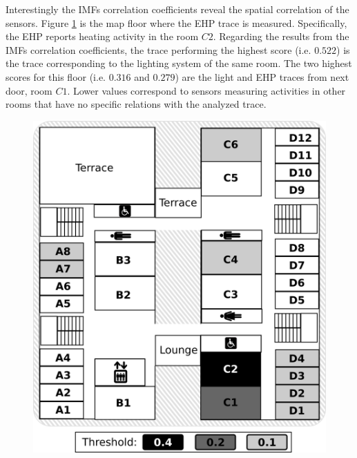 Interestingly the IMFs correlation coefficients reveal the spatial correlation of the sensors.
Figure \ref{fig:map} is the map floor where the EHP trace is measured.
Specifically, the EHP reports heating activity in the room $C2$.
Regarding the results from the IMFs correlation coefficients, the trace performing the highest score (i.e. $0.522$) is the trace corresponding to the lighting system of the same room.
The two highest scores for this floor (i.e. $0.316$ and $0.279$) are the light and EHP traces from next door, room $C1$.
Lower values correspond to sensors measuring activities in other rooms that have no specific relations with the analyzed trace.

\begin{figure}
\includegraphics[width=.5\textwidth]{img/floorMap.png}
\caption{}
\label{fig:map}
\end{figure}
